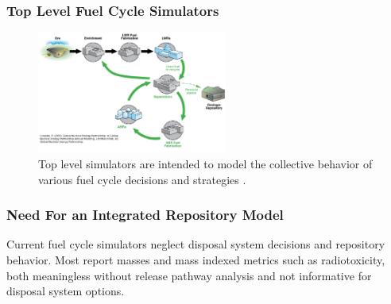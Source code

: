 

\begin{frame}[ctb!]
  \frametitle{Top Level Fuel Cycle Simulators}
  \begin{figure}[htbp!]
    \begin{center}
      \includegraphics[height=4cm]{./images/simulations.eps}
    \end{center}
    \caption{Top level simulators are intended to model the collective 
    behavior of various fuel cycle decisions and 
    strategies \cite{lisowski_global_2007}.}
    \label{fig:simulation}
  \end{figure}
\end{frame}

\begin{frame}[ctb!]
  \frametitle{Need For an Integrated Repository Model}
  Current fuel cycle simulators neglect disposal system decisions and 
  repository behavior. Most report masses and mass indexed metrics such 
  as radiotoxicity, both meaningless without release pathway analysis
  and not informative for disposal system options.

  

\end{frame}

